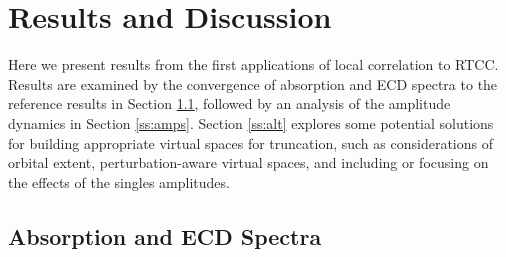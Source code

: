 
\section{Results and Discussion} \label{se:results} 
Here we present results from the first applications of local correlation to RTCC.
Results are examined
by the convergence of absorption and ECD spectra to the reference results
in Section \ref{ss:spectra}, followed by an analysis of the amplitude
dynamics in Section \ref{ss:amps}. 
Section \ref{ss:alt} explores some potential solutions for building
appropriate virtual spaces for truncation, such as considerations
of orbital extent,
perturbation-aware virtual spaces\cite{Crawford2019,DCunha2021}, and 
including or focusing on the effects of the singles amplitudes. 

\subsection{Absorption and ECD Spectra} \label{ss:spectra}
